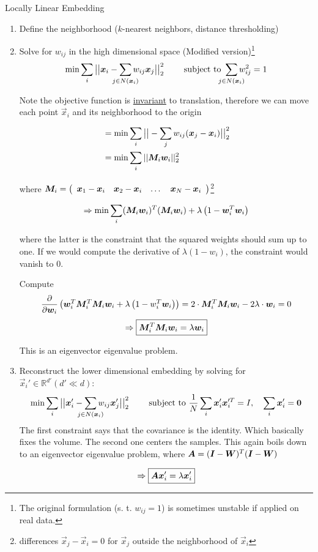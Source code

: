\begin{algorithm}[H]
\caption{Locally Linear Embedding}
\begin{enumerate}
    \item Define the neighborhood (\(k\)-nearest neighbors, distance thresholding)

    \item Solve for \(w_{ij}\) in the high dimensional space (Modified version)\footnote{The original formulation (s. t. $ w_{ij} = 1$) is sometimes unstable if applied on real data.}
        \[\min \sum_{i}\big|\big|\vec{x}_i - \sum_{\mathclap{j\in N(\vec{x}_i)}} w_{ij} \vec{x}_j\big|\big|_2^2 \qquad \text{ subject to } \sum_{\mathclap{j \in N(\vec{x}_i)}} w_{ij}^2 = 1\]


        Note the objective function is \underline{invariant} to translation, therefore we can move each point $\vec{x}_i$ and its neighborhood to the origin

        \begin{align*}
            &= \min \sum_{i}\big|\big|- \sum_j w_{ij} (\bm{x}_j - \bm{x}_i)\big|\big|_2^2 \\
          &= \min \sum_{i} ||\bm{M}_i\bm{w}_i||_2^2
        \end{align*}

        where $\bm{M}_i = \left(\begin{array}{cccc} \bm{x}_1 - \bm{x}_i & \bm{x}_2 - \bm{x}_i& \dots& \bm{x}_N - \bm{x}_i \end{array}\right)$\footnote{differences \(\vec{x}_j - \vec{x}_i = 0\) for \(\vec{x}_j\) outside the neighborhood of \(\vec{x}_i\)}

        \[\Rightarrow \min \sum_{i} (\bm{M}_i \bm{w}_i)^T (\bm{M}_i \bm{w}_i) + \lambda\left(1-\bm{w}_i^T \bm{w}_i\right)\]

        where the latter is the constraint that the squared weights should sum up to one. If we would compute the derivative of \(\lambda(1-w_i)\), the constraint would vanish to \(0\).

        Compute
        \[\frac{\partial}{\partial \bm{w}_i} \left(\bm{w}_i^T \bm{M}_i^T \bm{M}_i \bm{w}_i + \lambda\left(1-w_i^T \bm{w}_i\right)\right)=  2 \cdot \bm{M}_i^T \bm{M}_i \bm{w}_i - 2 \lambda  \cdot \bm{w}_i = 0\]
        \[\Rightarrow \boxed{\bm{M}_i^T \bm{M}_i \bm{w}_i = \lambda \bm{w}_i}\]

        This is an eigenvector eigenvalue problem.

    \item Reconstruct the lower dimensional embedding by solving for \(\vec{x}_i' \in \mathbb{R}^{d'} (d' \ll d)\):
        \[\min \sum_i\big|\big|\vec{x}_i' - \sum_{\mathclap{j \in N(\vec{x}_i)}} w_{ij} \vec{x}_j'\big|\big|_2^2 \qquad \text{ subject to } \frac{1}{N} \sum_i \vec{x}_i' \vec{x}_i'^T = I,\quad \sum_i \vec{x}_i' = \vec{0}\]
        The first constraint says that the covariance is the identity. Which basically fixes the volume. The second one centers the samples. This again boils down to an eigenvector eigenvalue problem, where $\bm{A} = (\bm{I} - \bm{W})^T (\bm{I} - \bm{W})$

          \[\Rightarrow \boxed{\bm{A} \bm{x}_i' = \lambda \bm{x}_i'}\]
\end{enumerate}
\end{algorithm}